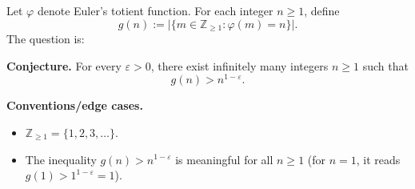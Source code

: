 Let $\varphi$ denote Euler's totient function. For each integer $n\ge 1$, define
\[
 g(n) := \bigl|\{m\in\mathbb{Z}_{\ge 1} : \varphi(m)=n\}\bigr|.
\]
The question is:

\medskip
\noindent\textbf{Conjecture.} For every $\varepsilon>0$, there exist infinitely many integers $n\ge 1$ such that
\[
 g(n) > n^{1-\varepsilon}.
\]

\medskip
\noindent\textbf{Conventions/edge cases.}
\begin{itemize}
\item $\mathbb{Z}_{\ge 1}=\{1,2,3,\dots\}$.
\item The inequality $g(n) > n^{1-\varepsilon}$ is meaningful for all $n\ge 1$ (for $n=1$, it reads $g(1)>1^{1-\varepsilon}=1$).
\end{itemize}

